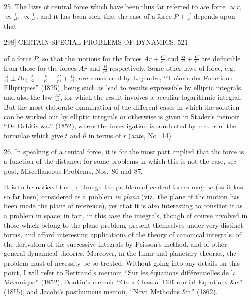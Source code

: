 \documentclass[11pt]{article}
\begin{document}
25. The laws of central force which have been thus far referred to are force $\propto r$, $\propto\frac{1}{r^{2}}$, $\propto\frac{1}{r^{3}}$; and it has been seen that the case of a force $P+\frac{C}{r^{3}}$ depends upon that

\newpage
\begin{center}
298] \hfill CERTAIN SPECIAL PROBLEMS OF DYNAMICS. \hfill 521
\end{center}

of a force $P$, so that the motions for the forces $Ar+\frac{C}{r^{3}}$ and $\frac{B}{r^{2}}+\frac{C}{r^{3}}$ are deducible from those for the forces $Ar$ and $\frac{B}{r^{2}}$ respectively. Some other laws of force, e.g.\ $\frac{A}{r^{2}}\pm Br$, $\frac{A}{r^{2}}+\frac{B}{r^{3}}+\frac{C}{r^{4}}+\frac{D}{r^{5}}$, are considered by Legendre, ``Th\'eorie des Fonctions Elliptiques'' (1825), being such as lead to results expressible by elliptic integrals, and also the law $\frac{M}{r^{2}}$, for which the result involves a peculiar logarithmic integral. But the most elaborate examination of the different cases in which the solution can be worked out by elliptic integrals or otherwise is given in Stader's memoir ``De Orbitis \&c.'' (1852), where the investigation is conducted by means of the formulae which give $t$ and $\theta$ in terms of $r$ (\emph{ante}, No.\ 14).

26. In speaking of a central force, it is for the most part implied that the force is a function of the distance: for some problems in which this is not the case, see post, Miscellaneous Problems, Nos.\ 86 and 87.

It is to be noticed that, although the problem of central forces may be (as it has so far been) considered as a problem \emph{in plano} (viz.\ the plane of the motion has been made the plane of reference), yet that it is also interesting to consider it as a problem in space; in fact, in this case the integrals, though of course involved in those which belong to the plane problem, present themselves under very distinct forms, and afford interesting applications of the theory of canonical integrals, of the derivation of the successive integrals by Poisson's method, and of other general dynamical theories. Moreover, in the lunar and planetary theories, the problem must of necessity be so treated. Without going into any details on this point, I will refer to Bertrand's memoir, ``Sur les \'equations diff\'erentielles de la M\'ecanique'' (1852), Donkin's memoir ``On a Class of Differential Equations \&c.'' (1855), and Jacobi's posthumous memoir, ``Nova Methodus \&c.'' (1862).
\end{document}
